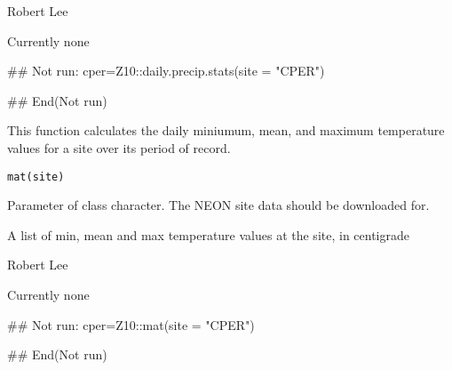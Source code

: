 \documentclass[a4paper]{book}
\begin{document}
%
\begin{Author}\relax
Robert Lee \\{}
\end{Author}
%
\begin{SeeAlso}\relax
Currently none
\end{SeeAlso}
%
\begin{Examples}
\begin{ExampleCode}
## Not run: 
cper=Z10::daily.precip.stats(site = "CPER")

## End(Not run)
\end{ExampleCode}
\end{Examples}
%
\begin{Description}\relax
This function calculates the daily miniumum, mean, and maximum
temperature values for a site over its period of record.
\end{Description}
%
\begin{Usage}
\begin{verbatim}
mat(site)
\end{verbatim}
\end{Usage}
%
\begin{Arguments}
\begin{ldescription}
\item[\code{site}] Parameter of class character.
The NEON site data should be downloaded for.
\end{ldescription}
\end{Arguments}
%
\begin{Value}
A list of min, mean and max temperature
values at the site, in centigrade
\end{Value}
%
\begin{Author}\relax
Robert Lee \\{}
\end{Author}
%
\begin{SeeAlso}\relax
Currently none
\end{SeeAlso}
%
\begin{Examples}
\begin{ExampleCode}
## Not run: 
cper=Z10::mat(site = "CPER")

## End(Not run)
\end{ExampleCode}
\end{Examples}
\end{document}
